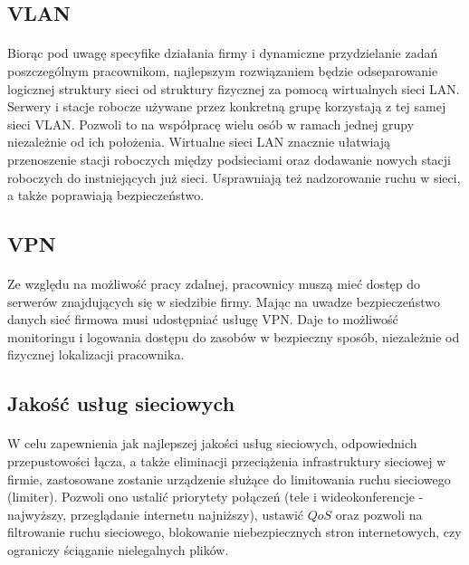 \subsection{VLAN}
\paragraph{}
Biorąc pod uwagę specyfike działania firmy i dynamiczne przydzielanie zadań poszczególnym pracownikom, najlepszym rozwiązaniem będzie odseparowanie logicznej struktury sieci od struktury fizycznej za pomocą wirtualnych sieci LAN. Serwery i stacje robocze używane przez konkretną grupę korzystają z tej samej sieci VLAN. Pozwoli to na współpracę wielu osób w ramach jednej grupy niezależnie od ich położenia. Wirtualne sieci LAN znacznie ułatwiają przenoszenie stacji roboczych między podsieciami oraz dodawanie nowych stacji roboczych do instniejących już sieci. Usprawniają też nadzorowanie ruchu w sieci, a także poprawiają bezpieczeństwo.

\subsection{VPN}
\paragraph{}
Ze względu na możliwość pracy zdalnej, pracownicy muszą mieć dostęp do serwerów znajdujących się w siedzibie firmy. Mając na uwadze bezpieczeństwo danych sieć firmowa musi udostępniać usługę VPN. Daje to możliwość monitoringu i logowania dostępu do zasobów w bezpieczny sposób, niezależnie od fizycznej lokalizacji pracownika.

\subsection{Jakość usług sieciowych}
\paragraph{}
W celu zapewnienia jak najlepszej jakości usług sieciowych, odpowiednich przepustowości łącza, a także eliminacji przeciążenia infrastruktury sieciowej w firmie, zastosowane zostanie urządzenie służące do limitowania ruchu sieciowego (limiter). Pozwoli ono ustalić priorytety połączeń (tele i wideokonferencje - najwyższy, przeglądanie internetu najniższy), ustawić $QoS$ oraz pozwoli na filtrowanie ruchu sieciowego, blokowanie niebezpiecznych stron internetowych, czy ograniczy ściąganie nielegalnych plików.

